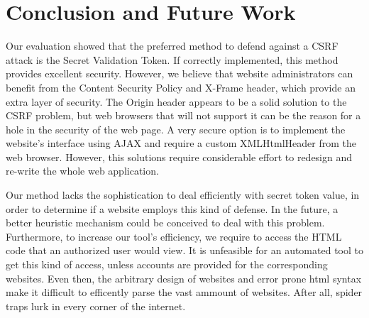\label{conclusion}
\section{Conclusion and Future Work}
	Our evaluation showed that the preferred method to defend against a CSRF attack is the Secret Validation Token.  If correctly implemented,
	this method provides excellent security.  However, we believe that website administrators can benefit from the Content Security Policy
	and X-Frame header, which provide an extra layer of security.  The Origin header appears to be a solid solution to the CSRF problem, but
	web browsers that will not support it can be the reason for a hole in the security of the web page.  A very secure option is to implement
	the website's interface using AJAX and require a custom XMLHtmlHeader from the web browser.  However, this solutions require considerable
	effort to redesign and re-write the whole web application.
	
	
	Our method lacks the sophistication to deal efficiently with secret token value, in order to determine if a website employs this kind of
	defense.  In the future, a better heuristic mechanism could be conceived to deal with this problem.   Furthermore, to increase our tool's
	efficiency, we require to access the HTML code that an authorized user would view.  It is unfeasible for an automated tool to get this 
	kind of access, unless accounts are provided for the corresponding websites.  Even then, the arbitrary design of websites and error prone
	html syntax make it difficult to efficently parse the vast ammount of websites.  After all, spider traps lurk in every corner of the internet. 
